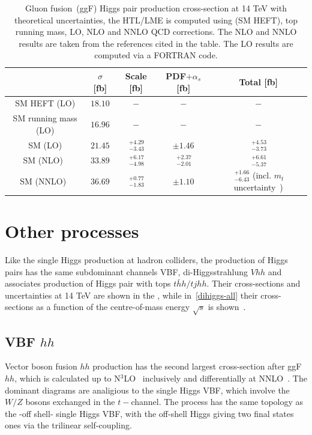 \begin{table}
	\centering
	\begin{tabular}{ccccc}
		\toprule
		& $ \sigma$	[fb] & Scale [fb] & PDF$+\alpha_s$ [fb]& Total [fb] \\
		\midrule
		SM HEFT  (LO)      &  $ 18.10$    &   $-$      & $-$   &  $-$ \\
		SM   running mass (LO)  &  $ 16.96$    &   $ -$   & $-$   &  $-$ \\
		SM    (LO)  &  $ 21.45$    &   $ \,^{+4.29}_{-3.43}$   & $\pm 1.46$   &  $ \,^{+4.53}_{-3.73}$ \\
		SM   (NLO)~\cite{Baglio:2012np}  &  $ 33.89$   &   $ \,^{+6.17}_{-4.98}$   & $ \,^{+2.37}_{-2.01}$   &  $ \,^{+6.61}_{-5.37}$ \\
		SM   (NNLO)~\cite{Grazzini:2018bsd}  &  $36.69$    &    $ \,^{+0.77}_{-1.83}$   & $\pm 1.10$   &  $ \,^{+1.66}_{-6.43}$ {\tiny(incl. $m_t$ uncertainty~\cite{Baglio:2020wgt})} \\
		\bottomrule
	\end{tabular}
	\caption{Gluon fusion~(ggF) Higgs pair production cross-section at 14 TeV with theoretical  uncertainties, the HTL/LME is computed using (SM HEFT), top running mass, LO, NLO and NNLO QCD corrections. The NLO and NNLO results are taken from the references cited in the table. The LO results are computed via a FORTRAN code.}
		\label{ggf_xsres}
\end{table}

\section{Other processes\label{otherhh}  }
Like the single Higgs production at hadron colliders, the production of Higgs pairs has the same subdominant channels VBF, di-Higgsstrahlung $ Vhh$ and associates production of Higgs pair with tops $t\bar hh /t j hh$. Their cross-sections and uncertainties at 14 TeV are shown in the , while in~\autoref{dihiggs-all} their cross-sections as a function of the centre-of-mass energy $\sqrt{s}$ is shown~\cite{DiMicco:2019ngk}. 

\subsection{VBF $hh$}
Vector boson fusion $hh$ production has the second largest cross-section after ggF $hh$, which is calculated up to N$^3$LO~\cite{Baglio:2012np,Ling:2014sne,Dreyer:2018qbw} inclusively and differentially at NNLO~\cite{Dreyer:2018rfu}. The dominant diagrams are analigious to the single Higgs VBF, which involve the $W/Z$ bosons exchanged in the $t-$channel. The process has the same topology as the -off shell- single Higgs VBF, with the off-shell Higgs giving two final states ones via the trilinear self-coupling. 
